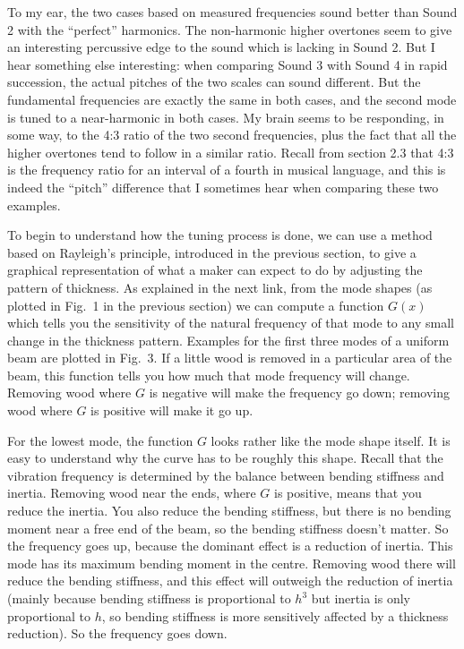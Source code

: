   To my ear, the two cases based on measured frequencies sound better than 
  Sound 2 with the ``perfect'' harmonics. The non-harmonic higher overtones 
  seem to give an interesting percussive edge to the sound which is lacking in 
  Sound 2. But I hear something else interesting: when comparing Sound 3 with 
  Sound 4 in rapid succession, the actual pitches of the two scales can sound 
  different. But the fundamental frequencies are exactly the same in both 
  cases, and the second mode is tuned to a near-harmonic in both cases. My 
  brain seems to be responding, in some way, to the 4:3 ratio of the two second 
  frequencies, plus the fact that all the higher overtones tend to follow in a 
  similar ratio. Recall from section 2.3 that 4:3 is the frequency ratio for an 
  interval of a fourth in musical language, and this is indeed the ``pitch'' 
  difference that I sometimes hear when comparing these two examples. 

  To begin to understand how the tuning process is done, we can use a method 
  based on Rayleigh's principle, introduced in the previous section, to give a 
  graphical representation of what a maker can expect to do by adjusting the 
  pattern of thickness. As explained in the next link, from the mode shapes (as 
  plotted in Fig.\ 1 in the previous section) we can compute a function $G(x)$ 
  which tells you the sensitivity of the natural frequency of that mode to any 
  small change in the thickness pattern. Examples for the first three modes of 
  a uniform beam are plotted in Fig.\ 3. If a little wood is removed in a 
  particular area of the beam, this function tells you how much that mode 
  frequency will change. Removing wood where $G$ is negative will make the 
  frequency go down; removing wood where $G$ is positive will make it go up. 


  For the lowest mode, the function $G$ looks rather like the mode shape 
  itself. It is easy to understand why the curve has to be roughly this shape. 
  Recall that the vibration frequency is determined by the balance between 
  bending stiffness and inertia. Removing wood near the ends, where $G$ is 
  positive, means that you reduce the inertia. You also reduce the bending 
  stiffness, but there is no bending moment near a free end of the beam, so the 
  bending stiffness doesn't matter. So the frequency goes up, because the 
  dominant effect is a reduction of inertia. This mode has its maximum bending 
  moment in the centre. Removing wood there will reduce the bending stiffness, 
  and this effect will outweigh the reduction of inertia (mainly because 
  bending stiffness is proportional to $h^3$ but inertia is only proportional 
  to $h$, so bending stiffness is more sensitively affected by a thickness 
  reduction). So the frequency goes down. 

